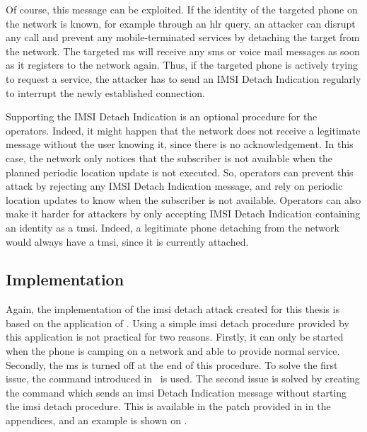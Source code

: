       Of course, this message can be exploited. If the identity of the
      targeted phone on the network is known, for example through an
      \gls{hlr} query, an attacker can disrupt any call and prevent any
      mobile-terminated services by detaching the target from the
      network. The targeted \gls{ms} will receive any \gls{sms} or
      voice mail messages as soon as it registers to the network again.
      Thus, if the targeted phone is actively trying to request a
      service, the attacker has to send an IMSI Detach Indication
      regularly to interrupt the newly established connection. 

      Supporting the IMSI Detach Indication is an optional procedure for
      the operators. Indeed, it might happen that the network does not
      receive a legitimate message without the user knowing it, since
      there is no acknowledgement. In this case, the network only
      notices that the subscriber is not available when the planned
      periodic location update is not executed. So, operators can
      prevent this attack by rejecting any IMSI Detach Indication
      message, and rely on periodic location updates to know when the
      subscriber is not available. Operators can also make it harder for
      attackers by only accepting IMSI Detach Indication containing an
      identity as a \gls{tmsi}. Indeed, a legitimate phone detaching
      from the network would always have a \gls{tmsi}, since it is
      currently attached.

      \subsection{Implementation}

      Again, the implementation of the \gls{imsi} detach attack created
      for this thesis is based on the  application of
      . Using a simple \gls{imsi} detach procedure
      provided by this application is not practical for two reasons.
      Firstly, it can only be started when the phone is camping on a
      network and able to provide normal service. Secondly, the \gls{ms}
      is turned off at the end of this procedure. To solve the first
      issue, the  command introduced
      in~ is used. The second issue is solved by
      creating the  command which sends an \gls{imsi}
      Detach Indication message without starting the \gls{imsi} detach
      procedure. This is available in the patch provided in
       in the appendices, and an example is shown on
      .

